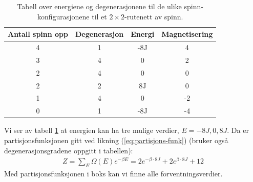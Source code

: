 \documentclass[11pt]{article}
\begin{document}
\begin{table}[ht]
\centering
\caption{Tabell over energiene og degenerasjonene til de ulike
  spinn-konfigurasjonene til et $2\times 2$-rutenett av spinn.}
\label{tab:spinn-energi-deg}
\vspace{0.5cm}
\begin{tabular}{cccc}
Antall spinn opp & Degenerasjon & Energi & Magnetisering \\
\hline
4 & 1 & -8J & 4 \\
3 & 4 & 0 & 2 \\
2 & 4 & 0 & 0 \\
2 & 2 & 8J & 0 \\
1 & 4 & 0 & -2 \\
0 & 1 & -8J & -4 \\
\hline
\end{tabular}

\end{table}

Vi ser av tabell \ref{tab:spinn-energi-deg} at energien kan ha tre
mulige verdier, $E = -8J,0,8J$. Da er partisjonsfunksjonen gitt ved
likning (\ref{eq:partisjons-funk}) (bruker også degenerasjonsgradene
oppgitt i tabellen):
\begin{align}
  Z = \sum_E \Omega(E)e^{-\beta E} = 2e^{-\beta \cdot 8J} + 2e^{\beta
  \cdot 8J} + 12\label{eq:partisjons-funk-2x2}
\end{align}
Med partisjonsfunksjonen i boks kan vi finne alle forventningsverdier.
\end{document}

